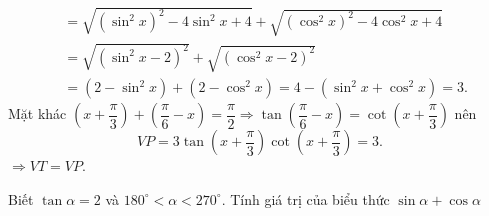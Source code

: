 \begin{ex}
{\begin{enumerate}
\begin{align*}
				&=\sqrt{\left(\sin ^2x\right)^2-4\sin  ^2x+4}+\sqrt{\left(\cos ^2x\right)^2-4\cos ^2x+4}\\
				&=\sqrt{\left(\sin ^2x-2\right)^2}+\sqrt{\left(\cos  ^2x-2\right)^2}\\
				&=\left(2-\sin ^2x\right)+\left(2-\cos  ^2x\right)=4-\left(\sin ^2x+\cos ^2x\right)=3.
			\end{align*}
			 Mặt khác $\left(x+\dfrac{\pi}{3} \right)+\left(\dfrac{\pi}{6}-x\right)=\dfrac{\pi}{2} \Rightarrow \tan \left(\dfrac{\pi}{6}-x\right)=\cot \left(x+\dfrac{\pi}{3} \right)$ nên
			 \[VP=3\tan \left(x+\dfrac{\pi}{3} \right)\cot \left(x+\dfrac{\pi}{3} \right)=3.\]
			 $\Rightarrow VT=VP.$
		\end{enumerate}
	} 
\end{ex}

\begin{ex}%
	 Biết $\tan \alpha=2$ và $180^{\circ} < \alpha < 270^{\circ}$. Tính giá trị của biểu thức $\sin \alpha+\cos \alpha$
\end{ex}

